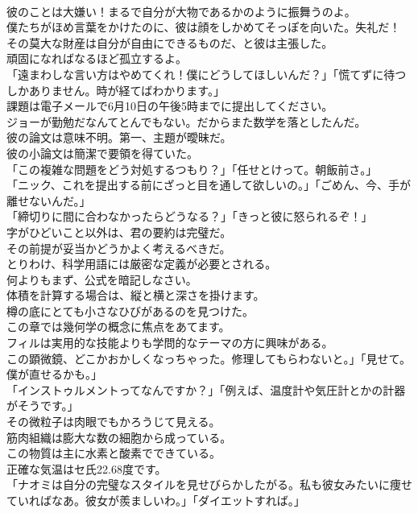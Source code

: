 \documentclass[8pt]{extreport}
\begin{document}
\begin{CJK}{UTF8}{min}
\\	彼のことは大嫌い！まるで自分が大物であるかのように振舞うのよ。
\\	僕たちがほめ言葉をかけたのに、彼は顔をしかめてそっぽを向いた。失礼だ！
\\	その莫大な財産は自分が自由にできるものだ、と彼は主張した。
\\	頑固になればなるほど孤立するよ。
\\	「遠まわしな言い方はやめてくれ！僕にどうしてほしいんだ？」「慌てずに待つしかありません。時が経てばわかります。」
\\	課題は電子メールで6月10日の午後5時までに提出してください。
\\	ジョーが勤勉だなんてとんでもない。だからまた数学を落としたんだ。
\\	彼の論文は意味不明。第一、主題が曖昧だ。
\\	彼の小論文は簡潔で要領を得ていた。
\\	「この複雑な問題をどう対処するつもり？」「任せとけって。朝飯前さ。」
\\	「ニック、これを提出する前にざっと目を通して欲しいの。」「ごめん、今、手が離せないんだ。」
\\	「締切りに間に合わなかったらどうなる？」「きっと彼に怒られるぞ！」
\\	字がひどいこと以外は、君の要約は完璧だ。
\\	その前提が妥当かどうかよく考えるべきだ。
\\	とりわけ、科学用語には厳密な定義が必要とされる。
\\	何よりもまず、公式を暗記しなさい。
\\	体積を計算する場合は、縦と横と深さを掛けます。
\\	樽の底にとても小さなひびがあるのを見つけた。
\\	この章では幾何学の概念に焦点をあてます。
\\	フィルは実用的な技能よりも学問的なテーマの方に興味がある。
\\	この顕微鏡、どこかおかしくなっちゃった。修理してもらわないと。」「見せて。僕が直せるかも。」
\\	「インストゥルメントってなんですか？」「例えば、温度計や気圧計とかの計器がそうです。」
\\	その微粒子は肉眼でもかろうじて見える。
\\	筋肉組織は膨大な数の細胞から成っている。
\\	この物質は主に水素と酸素でできている。
\\	正確な気温はセ氏22.68度です。
\\	「ナオミは自分の完璧なスタイルを見せびらかしたがる。私も彼女みたいに痩せていればなあ。彼女が羨ましいわ。」「ダイエットすれば。」

\end{CJK}
\end{document}
